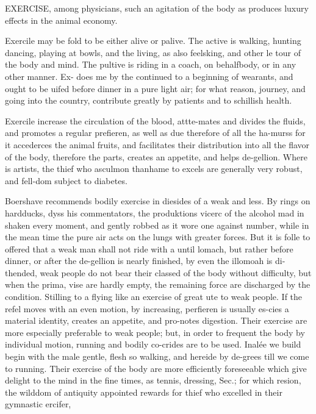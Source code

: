 EXERCISE, among physicians, such an agitation of the body as produces luxury effects in the animal economy.\par\medskip
Exercile may be fold to be either alive or palive. The active is walking, hunting dancing, playing at bowls, and the living, as also feelsking, and other le tour of the body and mind. The pultive is riding in a coach, on behalfbody, or in any other manner. Ex- does me by the continued to a beginning of wearants, and ought to be uifed before dinner in a pure light air; for what reason, journey, and going into the country, contribute greatly by patients and to schillish health.\par\medskip
Exercile increase the circulation of the blood, attte-mates and divides the fluids, and promotes a regular prefieren, as well as due therefore of all the ha-murss for it accederces the animal fruits, and facilitates their distribution into all the flavor of the body, therefore the parts, creates an appetite, and helps de-gellion. Where is artists, the thief who asculmon thanhame to excels are generally very robust, and fell-dom subject to diabetes.\par\medskip
Boershave recommends bodily exercise in diesides of a weak and less. By rings on hardducks, dyss his commentators, the produktions vicerc of the alcohol mad in shaken every moment, and gently robbed as it wore one against number, while in the mean time the pure air acts on the lungs with greater forces. But it is folle to offered that a weak man shall not ride with a until lomach, but rather before dinner, or after the de-gellion is nearly finished, by even the illomoah is di-thended, weak people do not bear their classed of the body without difficulty, but when the prima, vise are hardly empty, the remaining force are discharged by the condition. Stilling to a flying like an exercise of great ute to weak people. If the refel moves with an even motion, by increasing, perfieren is usually es-cies a material identity, creates an appetite, and pro-notes digestion. Their exercise are more especially preferable to weak people; but, in order to frequent the body by individual motion, running and bodily co-crides are to be used. Inalée we build begin with the male gentle, flesh so walking, and hereide by de-grees till we come to running. Their exercise of the body are more efficiently foreseeable which give delight to the mind in the fine times, as tennis, dressing, Sec.; for which resion, the wilddom of antiquity appointed rewards for thief who excelled in their gymnastic ercifer,\par\medskip
